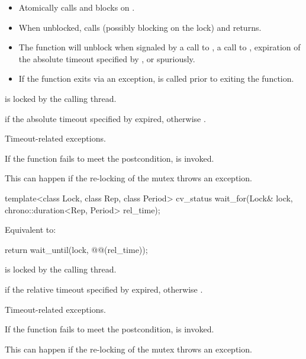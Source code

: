 \begin{itemdescr}
\pnum
\effects

\begin{itemize}
\item
{}%
Atomically calls  and blocks on .

\item
When unblocked, calls  (possibly blocking on the lock) and returns.

\item
The function will unblock when signaled by a call to , a call to ,
expiration of the absolute timeout specified by ,
or spuriously.

\item
If the function exits via an exception,  is called prior to exiting the function.
\end{itemize}

\pnum
\ensures
{} is locked by the calling thread.

\pnum
\returns
{} if
the absolute timeout specified by  expired,
otherwise .

\pnum
\throws
Timeout-related
exceptions.

\pnum
\remarks
If the function fails to meet the postcondition, 
is invoked.
\begin{note}
This can happen if the re-locking of the mutex throws an exception.
\end{note}
\end{itemdescr}

%
\begin{itemdecl}
template<class Lock, class Rep, class Period>
  cv_status wait_for(Lock& lock, chrono::duration<Rep, Period> rel_time);
\end{itemdecl}

\begin{itemdescr}
\pnum
\effects
Equivalent to:
\begin{codeblock}
return wait_until(lock, @@(rel_time));
\end{codeblock}

\pnum
\ensures
{} is locked by the calling thread.

\pnum
\returns
{} if
the relative timeout specified by  expired,
otherwise .

\pnum
\throws
Timeout-related
exceptions.

\pnum
\remarks
If the function fails to meet the postcondition, 
is invoked.
\begin{note}
This can happen if the re-locking of the mutex throws an exception.
\end{note}
\end{itemdescr}

